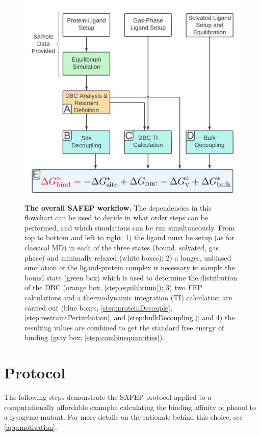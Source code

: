 \documentclass[9pt,tutorial]{Styling/livecoms}
\begin{document}
\begin{figure}[h]
    \centering
    \includegraphics[width=.9\linewidth]{CoarseGrainedWorkflow.pdf}
    \caption[test]{\textbf{The overall SAFEP workflow.} The dependencies in this flowchart can be used to decide in what order steps can be performed, and which simulations can be run simultaneously. From top to bottom and left to right: 1) the ligand must be setup (as for classical MD) in each of the three states (bound, solvated, gas phase) and minimally relaxed (white boxes); 2) a longer, unbiased simulation of the ligand-protein complex is necessary to sample the bound state (green box) which is used to determine the distribution of the DBC (orange box, \ref{step:equilibrium}); 3) two FEP calculations and a thermodynamic integration (TI) calculation are carried out (blue boxes, \ref{step:proteinDecouple}, \ref{step:restraintPerturbation}, and \ref{step:bulkDecoupling}); and 4) the resulting values are combined to get the standard free energy of binding (gray box; \ref{step:combinequantities}).}
    \label{fig:workflow}
\end{figure}
\onecolumn
\section{Protocol} \label{sec:protocol}
\vspace{0.5em}

The following steps demonstrate the SAFEP protocol applied to a computationally affordable example: calculating the binding affinity of phenol to a lysozyme mutant.
For more details on the rationale behind this choice, see \ref{app:motivation}.
\end{document}
